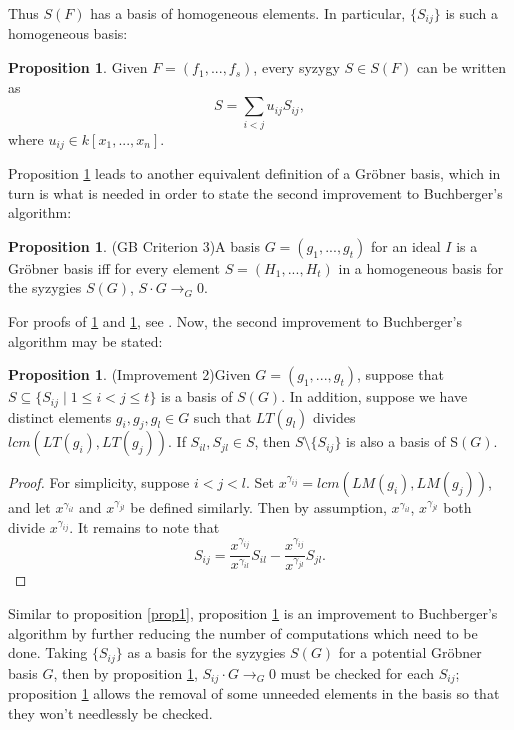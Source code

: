 \documentclass[reqno]{amsart}
\theoremstyle{definition}
\newtheorem{prop}[lem]{Proposition}
\theoremstyle{definition}
\begin{document}
Thus $S(F)$ has a basis of homogeneous elements. In particular, $\{S_{ij}\}$ is such a homogeneous basis: 

\begin{prop}\label{proplem}
Given $F = (f_1, ..., f_s)$, every syzygy $S\in S(F)$ can be written as 
$$S = \sum_{i<j}u_{ij}S_{ij},$$
where $u_{ij}\in k[x_1,...,x_n]$. 
\end{prop}


Proposition \ref{proplem} leads to another equivalent definition of a Gr{\"o}bner basis, which in turn is what is needed in order to state the second improvement to Buchberger's algorithm:

\begin{prop}{(GB Criterion 3)}\label{gbc3}
A basis $G = (g_1, ..., g_t)$ for an ideal $I$ is a Gr{\"o}bner basis iff for every element $S = (H_1,...,H_t)$ in a homogeneous basis for the syzygies $S(G)$, $S\cdot G \rightarrow_G 0.$ 
\end{prop}

For proofs of \ref{gbc3} and \ref{proplem}, see \cite{OsheaIVA}. Now, the second improvement to Buchberger's algorithm may be stated: 

\begin{prop}{(Improvement 2)}\label{prop2}
Given $G = (g_1,...,g_t)$, suppose that $S\subseteq \{S_{ij}\mid 1\leq i<j\leq t\}$ is a basis of $S(G)$. In addition, suppose we have distinct elements $g_i, g_j, g_l\in G$ such that $LT(g_l)$ divides $lcm(LT(g_i),LT(g_j))$. If $S_{il}, S_{jl}\in S$, then $S\setminus \{S_{ij}\}$ is also a basis of S$(G)$. 
\end{prop}
\begin{proof}
For simplicity, suppose $i<j<l$. Set $x^{\gamma_{ij}} = lcm(LM(g_i),LM(g_j))$, and let $x^{\gamma_{il}}$ and $x^{\gamma_{jl}}$ be defined similarly. Then by assumption, $x^{\gamma_{il}}$, $x^{\gamma_{jl}}$ both divide $x^{\gamma_{ij}}$. It remains to note that $$ S_{ij} = \frac{x^{\gamma_{ij}}}{x^{\gamma_{il}}}S_{il} - \frac{x^{\gamma_{ij}}}{x^{\gamma_{jl}}}S_{jl}.$$
\end{proof}

Similar to proposition \ref{prop1}, proposition \ref{prop2} is an improvement to Buchberger's algorithm by further reducing the number of computations which need to be done. Taking $\{S_{ij}\}$ as a basis for the syzygies $S(G)$ for a potential Gr{\"o}bner basis $G$, then by proposition \ref{gbc3}, $S_{ij}\cdot G \rightarrow_G 0$ must be checked for each $S_{ij}$; proposition \ref{prop2} allows the removal of some unneeded elements in the basis so that they won't needlessly be checked. 
\end{document}
